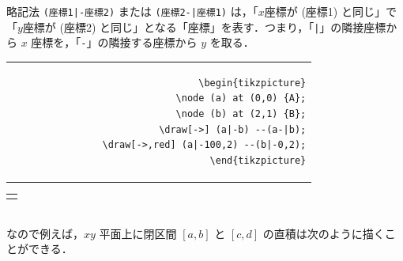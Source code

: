 \documentclass[lualatex]{jlreq}
\begin{document}
略記法 \texttt{(座標1|-座標2)} または \texttt{(座標2-|座標1)} は，「\(x \)座標が (座標1) と同じ」で「\(y \)座標が (座標2) と同じ」となる「座標」を表す．つまり，「\texttt{|}」の隣接座標から \(x \) 座標を，「\texttt{-}」の隣接する座標から \(y \) を取る．
\\[0.5em]
\begin{minipage}{0.58 \textwidth}
    \begin{flushright}
        \begin{tabular}{r}
            \begin{lstlisting}[language={[LaTeX] TeX},
            numbers=none,breaklines=true,gobble=12,frame=none]
            \begin{tikzpicture}
                \node (a) at (0,0) {A};
                \node (b) at (2,1) {B};
                \draw[->] (a|-b) --(a-|b);
                \draw[->,red] (a|-100,2) --(b|-0,2);
            \end{tikzpicture}
            \end{lstlisting}
        \end{tabular}
    \end{flushright}
\end{minipage}
\begin{minipage}{0.34 \textwidth}
    \begin{flushleft}
        \begin{tabular}{l}
            \begin{tikzpicture}
                \node (a) at (0,0) {A};
                \node (b) at (2,1) {B};
                \draw[->] (a|-b) --(a-|b);
                \draw[->,red] (a|-100,2) --(b|-0,2);
            \end{tikzpicture}
        \end{tabular}
    \end{flushleft}
\end{minipage}
\hfill
\\[1em]
なので例えば，\(xy \) 平面上に閉区間 \([a,b]\) と \([c,d]\) の直積は次のように描くことができる．
\\[0.5em]
\end{document}
